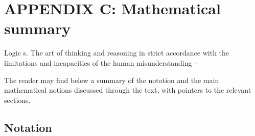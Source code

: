 \documentclass[
		twoside,openright,titlepage,numbers=noenddot,manychapters,
		headinclude,%
                footinclude=false,cleardoublepage=empty,
                BCOR=5mm,
		fontsize=11pt, %
                 enabledeprecatedfontcommands]{scrreprt}
\begin{document}
\chapter{APPENDIX C: Mathematical summary}
\thispagestyle{empty}
\label{maths}
\begin{origquote}

    Logic s. The art of thinking and reasoning in strict accordance with the limitations and incapacities of the human misunderstanding -- \cite{bierce1996dsd}

\end{origquote}


The reader may find below a summary of the notation and the main mathematical notions discussed through the text, with pointers to the relevant sections.


\section{Notation}
\end{document}
